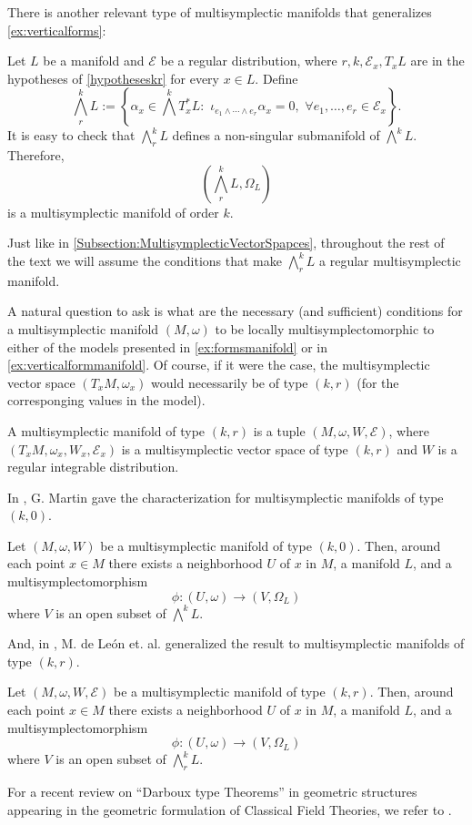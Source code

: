  There is another relevant type of multisymplectic manifolds that generalizes \cref{ex:verticalforms}:
 \begin{example}\label{ex:verticalformmanifold} Let $L$ be a manifold and $\mathcal{E}$ be a regular distribution, where $r, k, \mathcal{E}_x, T_x L$ are in the hypotheses of \cref{hypotheseskr} for every $x \in L$. Define $$\bigwedge^k_r L:= \left\{ \alpha_x \in \bigwedge^k T^\ast_xL: \,\, \iota_{e_1 \wedge \cdots \wedge e_r} \alpha_x = 0,\,\, \forall e_1, \dots, e_r \in \mathcal{E}_x\right\}.$$ It is easy to check that $\bigwedge^k_r L$ defines a non-singular submanifold of $\bigwedge^k L$. Therefore, $$\left(\bigwedge^k_r L, \Omega_L\right)$$ is a multisymplectic manifold of order $k$.
 \end{example}

 \begin{remark}Just like in \cref{Subsection:MultisymplecticVectorSpapces}, throughout the rest of the text we will assume the conditions that make $\bigwedge^k_r L$ a regular multisymplectic manifold.
 \end{remark}

 A natural question to ask is what are the necessary (and sufficient) conditions for a multisymplectic manifold $(M, \omega)$ to be locally multisymplectomorphic to either of the models presented in \cref{ex:formsmanifold} or in \cref{ex:verticalformmanifold}. Of course, if it were the case, the multisymplectic vector space $(T_x M, \omega_x)$ would necessarily be of type $(k, r)$ (for the corresponging values in the model).
 
 \begin{Def} A multisymplectic manifold of type $(k,r)$ is a tuple $(M, \omega, W, \mathcal{E})$, where $(T_xM,\omega_x, W_x, \mathcal{E}_x)$ is a multisymplectic vector space of type $(k,r)$ and $W$ is a regular integrable distribution.
 \end{Def}
 In \cite{Martin1988ADT}, G. Martin gave the characterization for multisymplectic manifolds of type $(k, 0)$.
   \begin{theorem} Let $(M, \omega, W)$ be a multisymplectic manifold of type $(k,0)$. Then, around each point $x \in M$ there exists a neighborhood $U$ of $x$ in $M$, a manifold $L$, and a multisymplectomorphism $$\phi: (U, \omega) \rightarrow (V, \Omega_L)$$ where $V$ is an open subset of $\bigwedge^k L $. 
 \end{theorem}
 And, in \cite{deleon2003tulczyjews}, M. de León et. al. generalized the result to multisymplectic manifolds of type $(k, r)$.
   \begin{theorem} \label{thm:darbouxmultisymplectic} Let $(M, \omega, W, \mathcal{E})$ be a multisymplectic manifold of type $(k,r)$. Then, around each point $x \in M$ there exists a neighborhood $U$ of $x$ in $M$, a manifold $L$, and a multisymplectomorphism $$\phi: (U, \omega) \rightarrow (V, \Omega_L)$$ where $V$ is an open subset of $\bigwedge^k_r L $.
   \end{theorem}

   For a recent review on ``Darboux type Theorems'' in geometric structures appearing in the geometric formulation of Classical Field Theories, we refer to \cite{gràcia2023darboux}.